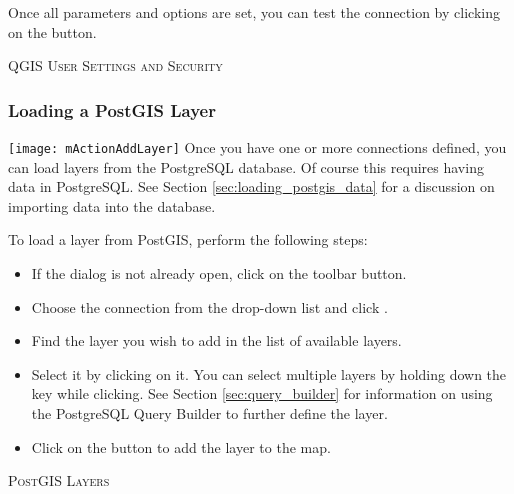 Once all parameters and options are set, you can test the connection by
clicking on the  button.

\begin{Tip}\caption{\textsc{QGIS User Settings and
Security}}
\end{Tip}

\subsubsection{Loading a PostGIS Layer}

\texttt{[image: mActionAddLayer]} Once you have one or more
connections defined, you can load layers from the PostgreSQL database. Of
course this requires having data in PostgreSQL. See Section
\ref{sec:loading_postgis_data} for a discussion on importing data into the
database. 

To load a layer from PostGIS, perform the following steps:

\begin{itemize}
\item If the  dialog is not already open, click on the
 toolbar button.
\item Choose the connection from the drop-down list and click .
\item Find the layer you wish to add in the list of available layers.
\item Select it by clicking on it. You can select multiple layers by holding
down the  key while clicking. See Section \ref{sec:query_builder} for
information on using the PostgreSQL Query Builder to further define the layer.
\item Click on the  button to add the layer to the map.
\end{itemize}

\begin{Tip}\caption{\textsc{PostGIS Layers}}
\end{Tip}

